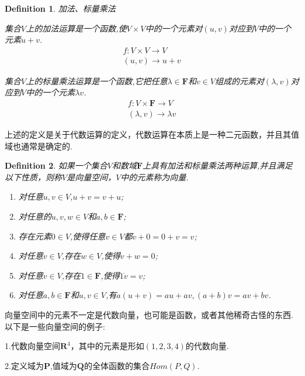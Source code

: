 \documentclass{ctexart}
\newtheorem{definition}{Definition}
\begin{document}
\begin{definition}
    加法、标量乘法

    集合$V$上的加法运算是一个函数,使$V\times V$中的一个元素对$(u,v)$对应到$V$中的一个元素$u+v$.
        \begin{align*}
            f:V\times V \to V\\
            (u,v) \to u+v
        \end{align*}
    
    集合$V$上的标量乘法运算是一个函数,它把任意$\lambda \in \mathbf{F}$和$v\in V$组成的元素对$(\lambda,v)$对应到$V$中的一个元素$\lambda v$.
        \begin{align*}
            f:V\times \mathbf{F} \to V\\
            (\lambda,v) \to \lambda v
        \end{align*}
\end{definition}

\noindent 上述的定义是关于代数运算的定义，代数运算在本质上是一种二元函数，并且其值域也通常是确定的.

\newpage
\begin{definition}
    如果一个集合$V$和数域$\mathbf{F}$上具有加法和标量乘法两种运算,并且满足以下性质，则称$V$是向量空间，$V$中的元素称为向量.
    \begin{enumerate}
        \item 对任意$u,v\in V$,$u+v=v+u$;
        \item 对任意的$u,v,w\in V$和$a,b\in \mathbf{F}$;
        \item 存在元素$0\in V$,使得任意$v\in V$都$v+0=0+v=v$;
        \item 对任意$v\in V$,存在$w\in V$,使得$v+w=0$;
        \item 对任意$v\in V$,存在$1\in \mathbf{F}$,使得$1\dot v=v$;
        \item 对任意$a,b\in \mathbf{F}$和$u,v\in V$,有$a(u+v)=au+av,(a+b)v=av+bv$.
    \end{enumerate}
\end{definition}

\noindent 向量空间中的元素不一定是代数向量，也可能是函数，或者其他稀奇古怪的东西.\\

\noindent 以下是一些向量空间的例子:

\noindent 1.代数向量空间$\mathbf{R}^4$，其中的元素是形如$(1,2,3,4)$的代数向量.

\noindent 2.定义域为$\mathbf{P}$,值域为$\mathbf{Q}$的全体函数的集合$Hom(P,Q)$.\\
\end{document}
